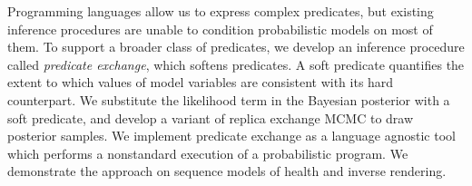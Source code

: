 Programming languages allow us to express complex predicates, but existing inference procedures are unable to condition probabilistic models on most of them.
To support a broader class of predicates, we develop an inference procedure called \emph{predicate exchange}, which softens predicates.
A soft predicate quantifies the extent to which values of model variables
are consistent with its hard counterpart.
We substitute the likelihood term in the Bayesian posterior with a soft predicate, and develop a variant of replica exchange MCMC to draw posterior samples.
We implement predicate exchange as a language agnostic tool which performs a nonstandard execution of a probabilistic program. 
We demonstrate the approach on sequence models of health and inverse rendering. 



%       